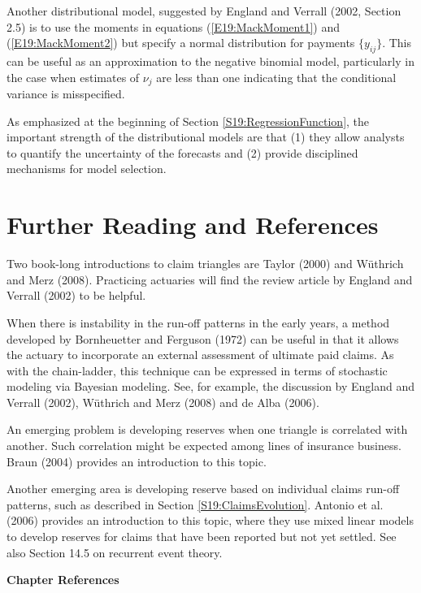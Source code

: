 Another distributional model, suggested by England and Verrall
(2002, Section 2.5) is to use the moments in equations
(\ref{E19:MackMoment1}) and (\ref{E19:MackMoment2}) but specify a
normal distribution for payments $\{y_{ij} \}$. This can be useful
as an approximation to the negative binomial model, particularly in
the case when estimates of $\nu_j$ are less than one indicating that
the conditional variance is misspecified.

As emphasized at the beginning of Section
\ref{S19:RegressionFunction}, the important strength of the
distributional models are that (1) they allow analysts to quantify
the uncertainty of the forecasts and (2) provide disciplined
mechanisms for model selection.


\section{Further Reading and References}

Two book-long introductions to claim triangles are Taylor (2000) and
W\"{u}thrich and Merz (2008). Practicing actuaries will find the
review article by England and Verrall (2002) to be helpful.

When there is instability in the run-off patterns in the early
years, a method developed by Bornheuetter and Ferguson (1972) can be
useful in that it allows the actuary to incorporate an external
assessment of ultimate paid claims. As with the chain-ladder, this
technique can be expressed in terms of stochastic modeling via
Bayesian modeling. See, for example, the discussion by England and
Verrall (2002), W\"{u}thrich and Merz (2008) and de Alba (2006).

An emerging problem is developing reserves when one triangle is
correlated with another. Such correlation might be expected among
lines of insurance business. Braun (2004) provides an introduction
to this topic.

Another emerging area is developing reserve based on individual
claims run-off patterns, such as described in Section
\ref{S19:ClaimsEvolution}. Antonio et al. (2006) provides an
introduction to this topic, where they use mixed linear models to
develop reserves for claims that have been reported but not yet
settled. See also Section 14.5 on recurrent event theory.

\bigskip

\textbf{Chapter References}

